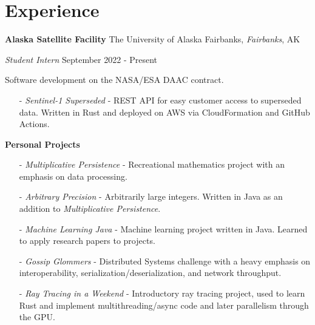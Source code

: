 ﻿\section{Experience}

\textbf{Alaska Satellite Facility}
\hfill
The University of Alaska Fairbanks, \textit{Fairbanks}, AK

\textit{Student Intern}
\hfill
{September 2022 - Present}

Software development on the NASA/ESA DAAC contract.

\begin{itemize}
    \item [-] \textit{Sentinel-1 Superseded} - REST API for easy customer access to superseded data. Written in Rust and deployed on AWS via CloudFormation and GitHub Actions.
    
\end{itemize}

\bigbreak
\textbf{Personal Projects}
\begin{itemize}\setlength\itemsep{0.1cm}
    \item [-] \textit{Multiplicative Persistence} - Recreational mathematics project with an emphasis on data processing.
    \item [-] \textit{Arbitrary Precision} - Arbitrarily large integers. Written in Java as an addition to \textit{Multiplicative Persistence}.
    \item [-] \textit{Machine Learning Java} - Machine learning project written in Java. Learned to apply research papers to projects.
    \item [-] \textit{Gossip Glommers} - Distributed Systems challenge with a heavy emphasis on interoperability, serialization/deserialization, and network throughput.
    \item [-] \textit{Ray Tracing in a Weekend} - Introductory ray tracing project, used to learn Rust and implement multithreading/async code and later parallelism through the GPU.
\end{itemize}